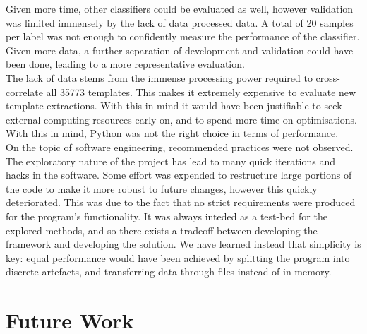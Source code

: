 Given more time, other classifiers could be evaluated as well,
however validation was limited immensely by the lack of data processed data.
A total of 20 samples per label was not enough to confidently measure the
performance of the classifier.
Given more data, a further separation of development and validation could have
been done, leading to a more representative evaluation.\\

The lack of data stems from the immense processing power required to
cross-correlate all 35773 templates.
This makes it extremely expensive to evaluate new template extractions.
With this in mind it would have been justifiable to seek external computing
resources early on, and to spend more time on optimisations.
With this in mind, Python was not the right choice in terms of performance.\\


On the topic of software engineering, recommended practices were not observed.
The exploratory nature of the project has lead to many quick iterations and hacks
in the software.
Some effort was expended to restructure large portions of the code to make it
more robust to future changes, however this quickly deteriorated.
This was due to the fact that no strict requirements were produced for the
program's functionality.
It was always inteded as a test-bed for the explored methods, and so there exists
a tradeoff between developing the framework and developing the solution.
We have learned instead that simplicity is key: equal performance would have
been achieved by splitting the program into discrete artefacts, and transferring
data through files instead of in-memory.


\section{Future Work}


